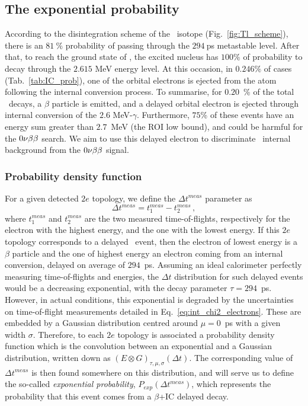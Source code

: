 \subsection{The exponential probability}

According to the disintegration scheme of the \Tl\ isotope (Fig.~\ref{fig:Tl_scheme}), there is an $81~\%$ probability of passing through the $294~$ps metastable level.
After that, to reach the ground state of \Pb, the excited nucleus has $100\%$ of probability to decay through the $2.615$ MeV energy level.
At this occasion, in $0.246\%$ of cases (Tab.~\ref{tab:IC_prob}), one of the orbital electrons is ejected from the atom following the internal conversion process.
To summarise, for $0.20$~\% of the total \Tl\ decays, a $\beta$ particle is emitted, and a delayed orbital electron is ejected through internal conversion of the $2.6$ MeV-$\gamma$.
Furthermore, $75$\% of these events have an energy sum greater than $2.7$~MeV (the ROI low bound), and could be harmful for the $0\nu\beta\beta$ search.
We aim to use this delayed electron to discriminate \Tl\ internal background from the $0\nu\beta\beta$ signal.


\subsubsection{Probability density function}

For a given detected $2e$ topology, we define the $\Delta t^{meas}$ parameter as
\begin{equation}
  \Delta t^{meas} = t_{1}^{meas}-t_{2}^{meas}\,,
  \label{eq:time_diff}
\end{equation}
where $t^{meas}_1$ and $t^{meas}_2$ are the two measured time-of-flights, respectively for the electron with the highest energy, and the one with the lowest energy.
If this $2e$ topology corresponds to a delayed \Tl\ event, then the electron of lowest energy is a $\beta$ particle and the one of highest energy an electron coming from an internal conversion, delayed on average of $294$~ps.
Assuming an ideal calorimeter perfectly measuring time-of-flights and energies, the $\Delta t$ distribution for such delayed events would be a decreasing exponential, with the decay parameter ${\tau=294}$~ps.
However, in actual conditions, this exponential is degraded by the uncertainties on time-of-flight measurements detailed in Eq.~\eqref{eq:int_chi2_electrons}.
These are embedded by a Gaussian distribution centred around ${\mu=0}$~ps with a given width $\sigma$.
Therefore, to each $2e$ topology is associated a probability density function which is the convolution between an exponential and a Gaussian distribution, written down as ${(E \otimes G)_{\tau,\mu,\sigma}(\Delta t)}$.
The corresponding value of $\Delta t^{meas}$ is then found somewhere on this distribution, and will serve us to define the so-called \emph{exponential probability}, $P_{exp}(\Delta t^{meas})$, which represents the probability that this event comes from a $\beta$+IC delayed decay.

